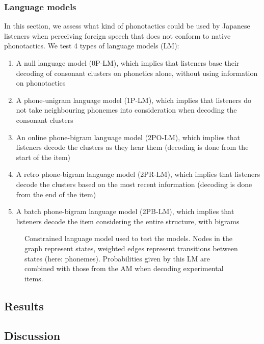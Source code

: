 \subsubsection{Language models}
In this section, we assess what kind of phonotactics could be used by Japanese listeners when perceiving foreign speech that does not conform to native phonotactics. We test 4 types of language models (LM): 
\begin{enumerate}
    \item A null language model (0P-LM), which implies that listeners base their decoding of consonant clusters on phonetics alone, without using information on phonotactics
    \item A phone-unigram language model (1P-LM), which implies that listeners do not take neighbouring phonemes into consideration when decoding the consonant clusters
    \item An online phone-bigram language model (2PO-LM), which implies that listeners decode the clusters as they hear them (decoding is done from the start of the item)
    \item A retro phone-bigram language model (2PR-LM), which implies that listeners decode the clusters based on the most recent information (decoding is done from the end of the item)
    \item A batch phone-bigram language model (2PB-LM), which implies that listeners decode the item considering the entire structure, with bigrams %
    \end{enumerate}

    \begin{figure}[htb]
    \centering
    \caption{Constrained language model used to test the models. Nodes in the graph represent states, weighted edges represent transitions between states (here: phonemes). Probabilities given by this LM are combined with those from the AM when decoding experimental items.}
    \label{fig:G_fsa}
\end{figure}
\subsection{Results}
\subsection{Discussion}



